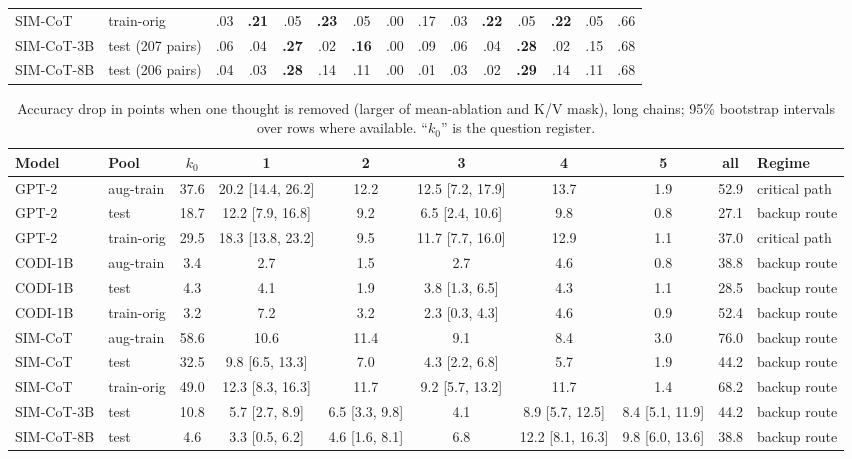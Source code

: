 \begin{table}[htbp]
\begin{tabular}{llcccccc|cccccc|c}
SIM-CoT & train-orig & .03 & \textbf{.21} & .05 & \textbf{.23} & .05 & .00 & .17 & .03 & \textbf{.22} & .05 & \textbf{.22} & .05 & .66 \\
SIM-CoT-3B & test (207 pairs) & .06 & .04 & \textbf{.27} & .02 & \textbf{.16} & .00 & .09 & .06 & .04 & \textbf{.28} & .02 & .15 & .68 \\
SIM-CoT-8B & test (206 pairs) & .04 & .03 & \textbf{.28} & .14 & .11 & .00 & .01 & .03 & .02 & \textbf{.29} & .14 & .11 & .68 \\
\bottomrule
\end{tabular}
\end{table}

\begin{table}[htbp]
\caption{Accuracy drop in points when one thought is removed (larger of mean-ablation and K/V mask), long chains; 95\% bootstrap intervals over rows where available. ``$k_0$'' is the question register.}
\label{tab:necessity}
\centering
\scriptsize
\setlength{\tabcolsep}{2.5pt}
\begin{tabular}{llcccccc|c|l}
\toprule
Model & Pool & $k_0$ & 1 & 2 & 3 & 4 & 5 & all & Regime \\
\midrule
GPT-2 & aug-train & 37.6 & 20.2 [14.4, 26.2] & 12.2 & 12.5 [7.2, 17.9] & 13.7 & 1.9 & 52.9 & critical path \\
GPT-2 & test & 18.7 & 12.2 [7.9, 16.8] & 9.2 & 6.5 [2.4, 10.6] & 9.8 & 0.8 & 27.1 & backup route \\
GPT-2 & train-orig & 29.5 & 18.3 [13.8, 23.2] & 9.5 & 11.7 [7.7, 16.0] & 12.9 & 1.1 & 37.0 & critical path \\
CODI-1B & aug-train & 3.4 & 2.7 & 1.5 & 2.7 & 4.6 & 0.8 & 38.8 & backup route \\
CODI-1B & test & 4.3 & 4.1 & 1.9 & 3.8 [1.3, 6.5] & 4.3 & 1.1 & 28.5 & backup route \\
CODI-1B & train-orig & 3.2 & 7.2 & 3.2 & 2.3 [0.3, 4.3] & 4.6 & 0.9 & 52.4 & backup route \\
SIM-CoT & aug-train & 58.6 & 10.6 & 11.4 & 9.1 & 8.4 & 3.0 & 76.0 & backup route \\
SIM-CoT & test & 32.5 & 9.8 [6.5, 13.3] & 7.0 & 4.3 [2.2, 6.8] & 5.7 & 1.9 & 44.2 & backup route \\
SIM-CoT & train-orig & 49.0 & 12.3 [8.3, 16.3] & 11.7 & 9.2 [5.7, 13.2] & 11.7 & 1.4 & 68.2 & backup route \\
SIM-CoT-3B & test & 10.8 & 5.7 [2.7, 8.9] & 6.5 [3.3, 9.8] & 4.1 & 8.9 [5.7, 12.5] & 8.4 [5.1, 11.9] & 44.2 & backup route \\
SIM-CoT-8B & test & 4.6 & 3.3 [0.5, 6.2] & 4.6 [1.6, 8.1] & 6.8 & 12.2 [8.1, 16.3] & 9.8 [6.0, 13.6] & 38.8 & backup route \\
\bottomrule
\end{tabular}
\end{table}

